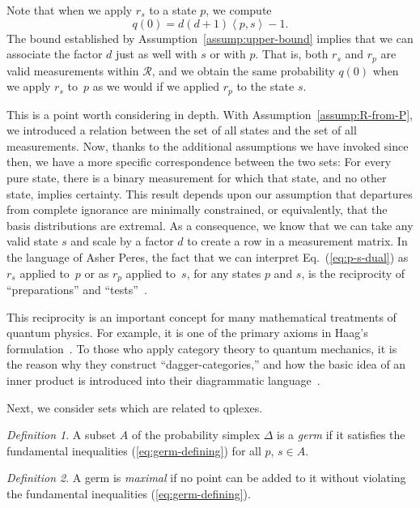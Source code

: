 \documentclass[aps,pra,superscriptaddress,10pt,tightenlines,twocolumn,nofootinbib]{revtex4}
\theoremstyle{remark}
\newtheorem{definition}{Definition}
\newcommand{\ps}{\Delta}
\newcommand{\cR}{\mathcal{R}}
\newcommand{\inprod}[2]{{\left\langle #1 , #2 \right\rangle}}
\begin{document}
Note that when we apply $r_{{s}}$ to a state ${p}$, we compute
\begin{equation}
q(0) = d(d+1)\inprod{p}{s} - 1.
\label{eq:p-s-dual}
\end{equation}
The bound established by Assumption~\ref{assump:upper-bound} implies
that we can associate the factor $d$ just as well with ${s}$ or
with ${p}$.  That is, both $r_{{s}}$ and $r_{{p}}$ are
valid measurements within $\cR$, and we obtain the same probability
$q(0)$ when we apply $r_{{s}}$ to~${p}$ as we would if we
applied $r_{{p}}$ to the state ${s}$.

This is a point worth considering in depth.  With
Assumption~\ref{assump:R-from-P}, we introduced a relation between the
set of all states and the set of all measurements.  Now, thanks to the
additional assumptions we have invoked since then, we have a more
specific correspondence between the two sets:  For every pure state,
there is a binary measurement for which that state, and no other
state, implies certainty.  This result depends upon our assumption
that departures from complete ignorance are minimally constrained, or
equivalently, that the basis distributions are extremal.  As a
consequence, we know that we can take any valid state $s$ and scale by
a factor $d$ to create a row in a measurement matrix.  In the language
of Asher Peres, the fact that we can interpret Eq.~(\ref{eq:p-s-dual})
as $r_s$ applied to~$p$ or as $r_p$ applied to~$s$, for any states $p$
and $s$, is the reciprocity of ``preparations'' and ``tests''~\cite{PeresBook}.

This reciprocity is an important concept for many mathematical treatments
of quantum physics.  For example, it is one of the primary axioms in
Haag's formulation~\cite{Haag, Araki}.  To those who apply category
theory to quantum mechanics, it is the reason why they construct
``dagger-categories,'' and how the basic idea of an inner product is
introduced into their diagrammatic language~\cite{coecke2016}.

Next, we consider sets which are related to qplexes.

\begin{definition}
A subset $A$ of the probability simplex $\ps$ is a \emph{germ} if it
satisfies the fundamental inequalities (\ref{eq:germ-defining}) for
all $p$, $s\in A$.
\end{definition}

\begin{definition}
A germ is \emph{maximal} if no point can be added to it without
violating the fundamental inequalities (\ref{eq:germ-defining}).
\end{definition}
\end{document}
